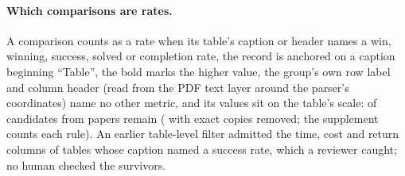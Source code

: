 \documentclass[sigconf,anonymous]{aamas}
\begin{document}
\paragraph{Which comparisons are rates.} A comparison counts as a rate
when its table's caption or header names a win, winning, success, solved
or completion rate, the record is anchored on a caption beginning
``Table'', the bold marks the higher value, the group's own row label and
column header (read from the PDF text layer around the parser's
coordinates) name no other metric, and its values sit on the table's
scale: \nRfKept{} of \nRfTableNamesARate{} candidates from
\nRfKeptPapers{} papers remain (\nPtwoResTypedRateLike{} with exact copies
removed; the supplement counts each rule). An earlier table-level filter
admitted the time, cost and return columns of tables whose caption named
a success rate, which a reviewer caught; no human checked the survivors.
\end{document}
